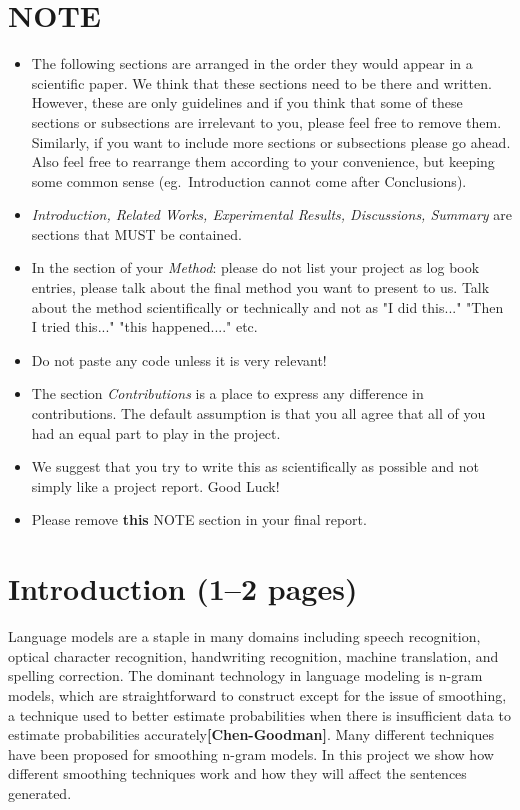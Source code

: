 \documentclass[a4paper,12pt]{article}
\begin{document}
\section*{NOTE}
\begin{itemize}

\item The following sections are arranged in the order they would appear in a scientific paper. We think that these sections need to be there and written. However, these are only guidelines and if you think that some of these sections or subsections are irrelevant to you, please feel free to remove them. Similarly, if you want to include more sections or subsections please go ahead. Also feel free to rearrange them according to your convenience, but keeping some common sense (eg.~Introduction cannot come after Conclusions).

\item \textit{Introduction, Related Works, Experimental Results, Discussions, Summary} are sections that MUST be contained.

\item In the section of your \textit{Method}: please do not list your project as log book entries, please talk about the final method you want to present to us. Talk about the method scientifically or technically and not as "I did this..." "Then I tried this..." "this happened...." etc.

\item Do not paste any code unless it is very relevant!

\item The section \textit{Contributions} is a place to express any difference in contributions. The default assumption is that you all agree that all of you had an equal part to play in the project.

\item We suggest that you try to write this as scientifically as possible and not simply like a project report. Good Luck!

\item Please remove \textbf{this} NOTE section in your final report.

\end{itemize}
\section{Introduction (1--2 pages)}
\label{sec:intro}

Language models are a staple in many domains including speech recognition, optical character
recognition, handwriting recognition, machine translation, and spelling correction. The dominant technology in language modeling is n-gram models, which are straightforward to construct except for the issue of smoothing, a technique used to better estimate probabilities when there is insufficient data to estimate probabilities accurately\textbf{[Chen-Goodman]}. Many different techniques have been proposed for smoothing n-gram models. In this project we show how different smoothing techniques work and how they will affect the sentences generated.  
\end{document}

